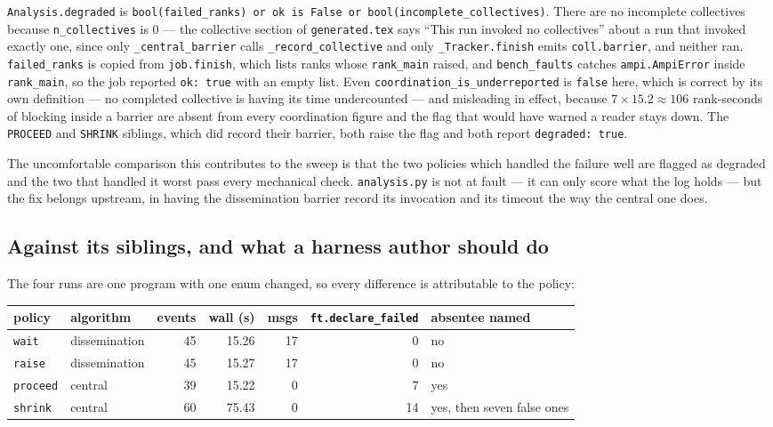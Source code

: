 \documentclass[11pt]{article}
\begin{document}
\texttt{Analysis.degraded} is
\texttt{bool(failed\_ranks) or ok is False or bool(incomplete\_collectives)}. There are no
incomplete collectives because \texttt{n\_collectives} is 0 --- the collective section of
\texttt{generated.tex} says ``This run invoked no collectives'' about a run that invoked
exactly one, since only \texttt{\_central\_barrier} calls
\texttt{\_record\_collective} and only \texttt{\_Tracker.finish} emits
\texttt{coll.barrier}, and neither ran. \texttt{failed\_ranks} is copied from
\texttt{job.finish}, which lists ranks whose \texttt{rank\_main} raised, and
\texttt{bench\_faults} catches \texttt{ampi.AmpiError} inside \texttt{rank\_main}, so the
job reported \texttt{ok: true} with an empty list. Even
\texttt{coordination\_is\_underreported} is \texttt{false} here, which is correct by its
own definition --- no completed collective is having its time undercounted --- and
misleading in effect, because $7 \times 15.2 \approx 106$ rank-seconds of blocking inside
a barrier are absent from every coordination figure and the flag that would have warned a
reader stays down. The \texttt{PROCEED} and \texttt{SHRINK} siblings, which did record
their barrier, both raise the flag and both report \texttt{degraded: true}.

The uncomfortable comparison this contributes to the sweep is that the two policies which
handled the failure well are flagged as degraded and the two that handled it worst pass
every mechanical check. \texttt{analysis.py} is not at fault --- it can only score what
the log holds --- but the fix belongs upstream, in having the dissemination barrier record
its invocation and its timeout the way the central one does.

\subsection{Against its siblings, and what a harness author should do}

The four runs are one program with one enum changed, so every difference is attributable
to the policy:

\begin{center}\footnotesize
\begin{tabular}{@{}llrrrrl@{}}
\toprule
policy & algorithm & events & wall (s) & msgs & \texttt{ft.declare\_failed} & absentee named \\
\midrule
\texttt{wait}    & dissemination & 45 & 15.26 & 17 & 0  & no \\
\texttt{raise}   & dissemination & 45 & 15.27 & 17 & 0  & no \\
\texttt{proceed} & central       & 39 & 15.22 & 0  & 7  & yes \\
\texttt{shrink}  & central       & 60 & 75.43 & 0  & 14 & yes, then seven false ones \\
\bottomrule
\end{tabular}\normalsize
\end{center}
\end{document}
